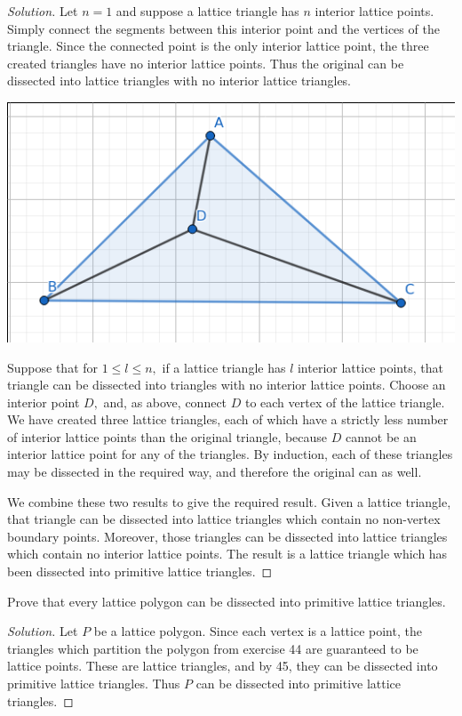 \documentclass[12pt]{article}
\newenvironment{exercise}[2][Exercise]{\begin{trivlist}
        \item[\hskip \labelsep {\bfseries #1}\hskip \labelsep {\bfseries #2.}]}{\end{trivlist}}
\newenvironment{solution}
        {\begin{proof}[Solution]}
                    {\end{proof}}
\begin{document}
\begin{exercise}{45}
\begin{solution}
        Let \( n = 1 \) and suppose a lattice triangle has \( n \) interior lattice points. Simply connect the segments between this interior point and the vertices of the triangle. Since the connected point is the only interior lattice point, the three created triangles have no interior lattice points. Thus the original can be dissected into lattice triangles with no interior lattice triangles.
        \begin{center}
            \includegraphics[scale=.5]{45-4}
        \end{center}
        Suppose that for \( 1 \leq l \leq n, \) if a lattice triangle has \( l \) interior lattice points, that triangle can be dissected into triangles with no interior lattice points. Choose an interior point \( D, \) and, as above, connect \( D \) to each vertex of the lattice triangle. We have created three lattice triangles, each of which have a strictly less number of interior lattice points than the original triangle, because \( D \) cannot be an interior lattice point for any of the triangles. By induction, each of these triangles may be dissected in the required way, and therefore the original can as well.

        We combine these two results to give the required result. Given a lattice triangle, that triangle can be dissected into lattice triangles which contain no non-vertex boundary points. Moreover, those triangles can be dissected into lattice triangles which contain no interior lattice points. The result is a lattice triangle which has been dissected into primitive lattice triangles.
    \end{solution}
\end{exercise}

\begin{exercise}{46}
    Prove that every lattice polygon can be dissected into primitive lattice triangles.
    \begin{solution}
        Let \( P \) be a lattice polygon. Since each vertex is a lattice point, the triangles which partition the polygon from exercise 44 are guaranteed to be lattice points. These are lattice triangles, and by 45, they can be dissected into primitive lattice triangles. Thus \( P \) can be dissected into primitive lattice triangles.
    \end{solution}
\end{exercise}
\pagebreak
\end{document}
